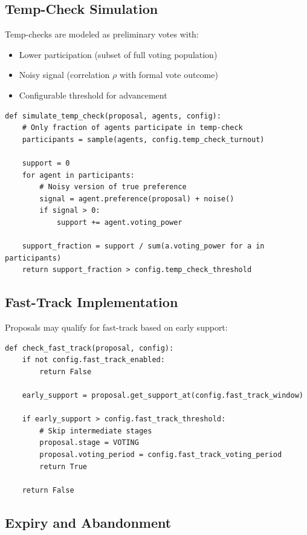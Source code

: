 \subsection{Temp-Check Simulation}

Temp-checks are modeled as preliminary votes with:
\begin{itemize}
    \item Lower participation (subset of full voting population)
    \item Noisy signal (correlation $\rho$ with formal vote outcome)
    \item Configurable threshold for advancement
\end{itemize}

\begin{lstlisting}[caption=Temp-check simulation (pseudocode)]
def simulate_temp_check(proposal, agents, config):
    # Only fraction of agents participate in temp-check
    participants = sample(agents, config.temp_check_turnout)

    support = 0
    for agent in participants:
        # Noisy version of true preference
        signal = agent.preference(proposal) + noise()
        if signal > 0:
            support += agent.voting_power

    support_fraction = support / sum(a.voting_power for a in participants)
    return support_fraction > config.temp_check_threshold
\end{lstlisting}

\subsection{Fast-Track Implementation}

Proposals may qualify for fast-track based on early support:

\begin{lstlisting}[caption=Fast-track qualification (pseudocode)]
def check_fast_track(proposal, config):
    if not config.fast_track_enabled:
        return False

    early_support = proposal.get_support_at(config.fast_track_window)

    if early_support > config.fast_track_threshold:
        # Skip intermediate stages
        proposal.stage = VOTING
        proposal.voting_period = config.fast_track_voting_period
        return True

    return False
\end{lstlisting}

\subsection{Expiry and Abandonment}

